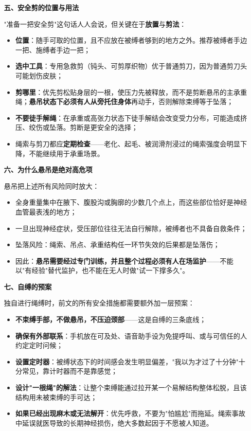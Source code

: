 \documentclass[12pt,UTF8]{ctexbook}
\begin{document}
\textbf{五、安全剪的位置与用法}

"准备一把安全剪"这句话人人会说，但关键在于\textbf{放置}与\textbf{剪法}：

\begin{itemize}
\item \textbf{位置}：随手可取的位置，且不应放在被缚者够到的地方之外。推荐被缚者手边一把、施缚者手边一把；
\item \textbf{选中工具}：专用急救剪（钝头、可剪厚织物）优于普通剪刀，因为普通剪刀头可能划伤皮肤；
\item \textbf{剪哪里}：优先剪松贴身层的一根，使压力先被释放，而不是剪断悬吊的主承重绳；\textbf{悬吊状态下必须有人从旁托住身体}再动手，否则解除束缚等于坠落；
\item \textbf{不要徒手解绳}：在承重或高张力状态下徒手解结会改变受力分布，可能造成挤压、绞伤或坠落。剪断是更安全的选择；
\item 绳索与剪刀都应\textbf{定期检查}——老化、起毛、被润滑剂浸过的绳索强度会明显下降，不能继续用于承重场景。
\end{itemize}

\textbf{六、为什么悬吊是绝对高危项}

悬吊把上述所有风险同时放大：

\begin{itemize}
\item 全身重量集中在腋下、腹股沟或胸廓的少数几个点上，而这些部位恰好是神经血管最表浅的地方；
\item 一旦出现神经症状，受压部位往往无法自行解除，被缚者也不具备自救条件；
\item 坠落风险：绳索、吊点、承重结构任一环节失效的后果都是坠落伤；
\item 因此：\textbf{悬吊需要经过专门训练，并且整个过程必须有人在场监护}——不能以"有经验"替代监护，也不能在无人时做"试一下撑多久"。
\end{itemize}

\textbf{七、自缚的预案}

独自进行绳缚时，前文的所有安全措施都需要额外加一层预案：

\begin{itemize}
\item \textbf{不束缚手部，不做悬吊，不压迫颈部}——这是自缚的三条底线；
\item \textbf{确保有外部联系}：手机放在可及处、语音助手设为免提呼叫、或与可信任的人约定定时问候；
\item \textbf{设置定时器}：被缚状态下的时间感会发生明显偏差，"我以为才过了十分钟"十分常见，靠计时器而不是靠感觉；
\item \textbf{设计"一根绳"的解法}：让整个束缚能通过拉开某一个易解结构整体松脱，且该结构用未被束缚的手可达；
\item \textbf{如果已经出现麻木或无法解开}：优先呼救，不要为"怕尴尬"而拖延。绳索事故中延误就医导致的长期神经损伤，绝大多数起因于不愿被人知道。
\end{itemize}
\end{document}
